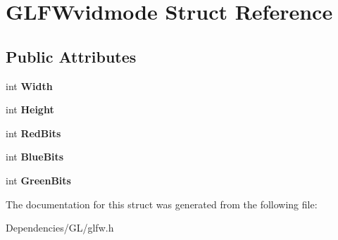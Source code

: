 \hypertarget{struct_g_l_f_wvidmode}{\section{\-G\-L\-F\-Wvidmode \-Struct \-Reference}
\label{struct_g_l_f_wvidmode}
}
\subsection*{\-Public \-Attributes}
\begin{DoxyCompactItemize}
\item 
\hypertarget{struct_g_l_f_wvidmode_a0b24939df1949294130aad3a91cf4d46}{int {\bfseries \-Width}}\label{struct_g_l_f_wvidmode_a0b24939df1949294130aad3a91cf4d46}

\item 
\hypertarget{struct_g_l_f_wvidmode_aa8e3c210f08ac22de7371e197c484404}{int {\bfseries \-Height}}\label{struct_g_l_f_wvidmode_aa8e3c210f08ac22de7371e197c484404}

\item 
\hypertarget{struct_g_l_f_wvidmode_a31d45c08435c998231b9c18105de4cea}{int {\bfseries \-Red\-Bits}}\label{struct_g_l_f_wvidmode_a31d45c08435c998231b9c18105de4cea}

\item 
\hypertarget{struct_g_l_f_wvidmode_a39e83d2273003a117ff5e358ced89c1e}{int {\bfseries \-Blue\-Bits}}\label{struct_g_l_f_wvidmode_a39e83d2273003a117ff5e358ced89c1e}

\item 
\hypertarget{struct_g_l_f_wvidmode_aeb9b620314f0970269401326314172ea}{int {\bfseries \-Green\-Bits}}\label{struct_g_l_f_wvidmode_aeb9b620314f0970269401326314172ea}

\end{DoxyCompactItemize}


\-The documentation for this struct was generated from the following file\-:\begin{DoxyCompactItemize}
\item 
\-Dependencies/\-G\-L/glfw.\-h\end{DoxyCompactItemize}
